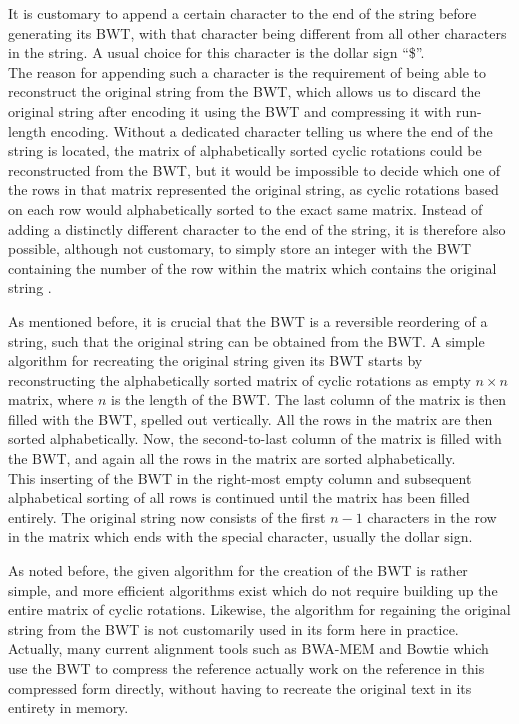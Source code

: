 \documentclass[a4paper,12pt,twoside,BCOR=10mm]{scrbook}
\begin{document}
It is customary to append a certain character to the end of the string before generating its BWT, 
with that character being different from all other characters in the string. 
A usual choice for this character is the dollar sign “\$”. \\
The reason for appending such a character is the requirement of being able to reconstruct the original string 
from the BWT, which allows us to discard the original string after encoding it using the BWT 
and compressing it with run-length encoding. 
Without a dedicated character telling us where the end of the string is located, 
the matrix of alphabetically sorted cyclic rotations could be reconstructed from the BWT, 
but it would be impossible to decide which one of the rows in that matrix represented the original 
string, as cyclic rotations based on each row would alphabetically sorted to the exact same matrix. 
Instead of adding a distinctly different character to the end of the string, 
it is therefore also possible, although not customary, to simply store an integer with the BWT containing 
the number of the row within the matrix which contains the original string \citep{Nelson1996}.

As mentioned before, it is crucial that the BWT is a reversible reordering of a string, 
such that the original string can be obtained from the BWT. 
A simple algorithm for recreating the original string given its BWT starts by reconstructing the alphabetically sorted 
matrix of cyclic rotations as empty $ n {\times} n $ matrix, where $ n $ is the length of the BWT. 
The last column of the matrix is then filled with the BWT, spelled out vertically. 
All the rows in the matrix are then sorted alphabetically. 
Now, the second-to-last column of the matrix is filled with the BWT, 
and again all the rows in the matrix are sorted alphabetically. \\
This inserting of the BWT in the right-most empty column and subsequent alphabetical sorting of all rows 
is continued until the matrix has been filled entirely. 
The original string now consists of the first $ n - 1 $ characters in the row in the matrix which 
ends with the special character, 
usually the dollar sign.


As noted before, the given algorithm for the creation of the BWT is rather simple, 
and more efficient algorithms exist which do not require building up the entire matrix of cyclic rotations. 
Likewise, the algorithm for regaining the original string from the BWT is not customarily 
used in its form here in practice. \\
Actually, many current alignment tools such as BWA-MEM \citep{Li2013} and Bowtie \citep{Langmead2009} which use 
the BWT to compress the reference actually 
work on the reference in this compressed form directly, without having 
to recreate the original text in its entirety in memory.
\end{document}
